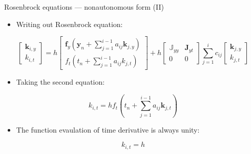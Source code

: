 \documentclass[serif]{beamer}
\begin{document}
\begin{frame}{Rosenbrock equations --- nonautonomous form (II)}
  \begin{itemize}
  \item<1-> Writing out Rosenbrock equation:
  \end{itemize}
  \begin{equation}
    \nonumber\left[ \begin{array}{c}
    \mathbf{k}_{i,y} \\
    k_{i,t}
    \end{array} \right ] = h\left[ \begin{array}{c}
    \mathbf{f}_y\left(\mathbf{y}_n + \sum_{j=1}^{i-1}a_{ij}\mathbf{k}_{j,y}\right) \\
    f_t\left(t_n + \sum_{j=1}^{i-1}a_{ij}k_{j,t}\right) 
    \end{array} \right] +  h\left[ \begin{array}{cc}
        \mathbb{J}_{yy} & \mathbf{J}_{yt} \\
    0 & 0
    \end{array} \right]\sum_{j=1}^i c_{ij}\left[ \begin{array}{c}
    \mathbf{k}_{j,y} \\
    k_{j,t}
    \end{array} \right]
  \end{equation}
  \begin{itemize}
  \item<1-> Taking the second equation:
  \end{itemize}
  \vfill
  \begin{equation}
    \nonumber k_{i,t} = h f_t\left(t_n + \sum_{j=1}^{i-1}a_{ij}\mathbf{k}_{j,t}\right)
  \end{equation}
  \begin{itemize}
  \item<1-> The function evaulation of time derivative is always unity:
  \end{itemize}
  \vfill
  \begin{equation}
    \nonumber k_{i,t} = h
  \end{equation}
\end{frame}
\end{document}
